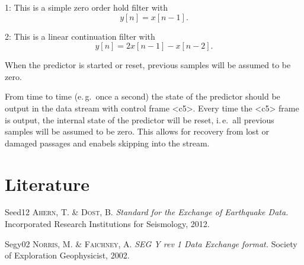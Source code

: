 \documentclass[DIV=10]{scrartcl}
\newcommand\litref[1]{\textref{[#1]}}
\newenvironment{refliterature}
{\list{}{
  \setlength{\leftmargin}{45pt}
  \setlength{\labelwidth}{45pt}
  \setlength{\labelsep}{0pt}
  \setlength{\itemindent}{0pt}
  \setlength{\itemsep}{-2pt}
  \let\makelabel\litref
}\RaggedRight}
{\endlist}
\begin{document}
1: This is a simple zero order hold filter with
\[
  y[n] = x[n - 1].
\]

2: This is a linear continuation filter with
\[
  y[n] = 2x[n - 1] - x[n - 2].
\]

When the predictor is started or reset, previous samples will be assumed to be zero.

From time to time (e.\,g.\ once a second) the state of the predictor should be output in the data stream with control frame <c5>.
Every time the <c5> frame is output, the internal state of the predictor will be reset, i.\,e.\ all previous samples will be assumed to be zero.
This allows for recovery from lost or damaged passages and enabels skipping into the stream.

\section{Literature}

\begin{refliterature}
\item[Seed12] \textsc{Ahern, T. \& Dost, B.} \textit{Standard for the Exchange of Earthquake Data.} Incorporated Research Institutions for Seismology, 2012.
\item[Segy02] \textsc{Norris, M. \& Faichney, A.} \textit{SEG Y rev 1 Data Exchange format.} Society of Exploration Geophysicist, 2002.
\end{refliterature}
\end{document}

